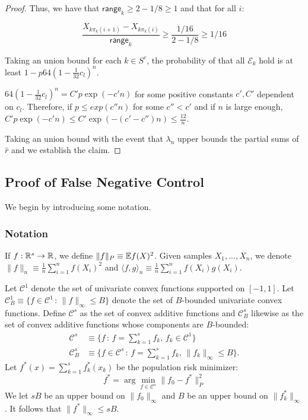 \begin{proof}
Thus, we have that $\mathsf{range}_k \geq 2 - 1/8 \geq 1$ and that for all $i$:

\[
\frac{X_{k\pi_k(i+1)} - X_{k \pi_k(i)}}{\mathsf{range}_k} \geq 
\frac{ 1/16 }{ 2 - 1/8} \geq 1/16
\]

Taking an union bound for each $k \in S^c$, the probability of that all $\mathcal{E}_k$ hold is at least $1 - p 64 \left( 1 - \frac{1}{32} c_l \right)^n$.

$64 \left( 1 - \frac{1}{32} c_l \right)^n = C' p \exp( - c' n)$ for some positive constants $c', C'$ dependent on $c_l$. Therefore, if $p \leq exp( c'' n)$ for some $c'' < c'$ and if $n$ is large enough, $C' p \exp( - c' n) \leq C' \exp( - (c' - c'') n) \leq \frac{12}{n}$.

Taking an union bound with the event that $\lambda_n$ upper bounds the partial sums of $\hat{r}$ and we establish the claim. 

\end{proof}


 
 
 \subsection{Proof of False Negative Control}
 \label{sec:false_negative_proof}
 We begin by introducing some notation.
 \subsubsection{Notation} 
\label{sec:false_negative_proof_notations}
If $f : \mathbb{R}^s \rightarrow {\mathbb R}$, we define $\| f \|_P \equiv {\mathbb E} f(X)^2$. 
Given samples $X_1,...,X_n$, we denote $\| f \|_n \equiv \frac{1}{n} \sum_{i=1}^n f(X_i)^2$ and $\langle f, g \rangle_n \equiv \frac{1}{n} \sum_{i=1}^n f(X_i) g(X_i)$. 

Let $\mathcal{C}^1$ denote the set of univariate convex functions supported on $[-1,1]$. Let $\mathcal{C}^1_B \equiv \{ f \in \mathcal{C}^1 \,:\, \| f \|_\infty \leq B \}$ denote the set of $B$-bounded univariate convex functions. 
Define $\mathcal{C}^s$ as the set of convex additive functions and
$\mathcal{C}^s_B$ likewise as the set of convex additive functions
whose components are $B$-bounded:
\begin{align*}
\mathcal{C}^s &\equiv \{ f \,:\, f = \sum_{k=1}^s f_k, \,
   f_k \in \mathcal{C}^1 \} \\
\mathcal{C}^s_B &\equiv \{ f \in \mathcal{C}^s \,:\, 
f = \sum_{k=1}^s f_k, \, \| f_k \|_\infty \leq B \}.
\end{align*}
Let $f^*(x) = \sum_{k=1}^s f^*_k(x_k)$ be the population risk minimizer:
\[
f^* = \arg\min_{f \in \mathcal{C}^s} \| f_0 - f^* \|_P^2
\]
We let $sB$ be an upper bound on $\| f_0 \|_\infty$ and $B$ be an
upper bound on $\| f^*_k \|_\infty$. 
It follows that $\|f^* \|_\infty \leq s B$.


